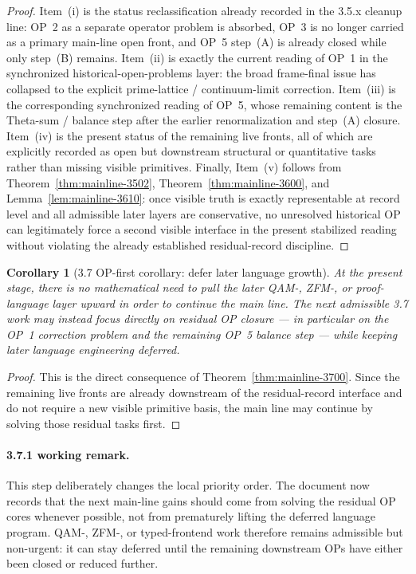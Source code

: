 \documentclass[12pt,a4paper]{article}
\newtheorem{corollary}[theorem]{Corollary}
\begin{document}
\begin{proof}
Item~(i) is the status reclassification already recorded in the 3.5.x cleanup line: OP~2 as a separate operator problem is absorbed, OP~3 is no longer carried as a primary main-line open front, and OP~5 step~(A) is already closed while only step~(B) remains. Item~(ii) is exactly the current reading of OP~1 in the synchronized historical-open-problems layer: the broad frame-final issue has collapsed to the explicit prime-lattice / continuum-limit correction. Item~(iii) is the corresponding synchronized reading of OP~5, whose remaining content is the Theta-sum / balance step after the earlier renormalization and step~(A) closure. Item~(iv) is the present status of the remaining live fronts, all of which are explicitly recorded as open but downstream structural or quantitative tasks rather than missing visible primitives. Finally, Item~(v) follows from Theorem~\ref{thm:mainline-3502}, Theorem~\ref{thm:mainline-3600}, and Lemma~\ref{lem:mainline-3610}: once visible truth is exactly representable at record level and all admissible later layers are conservative, no unresolved historical OP can legitimately force a second visible interface in the present stabilized reading without violating the already established residual-record discipline.
\end{proof}

\begin{corollary}[3.7 OP-first corollary: defer later language growth]
\label{cor:mainline-3700}
At the present stage, there is no mathematical need to pull the later QAM-, ZFM-, or proof-language layer upward in order to continue the main line. The next admissible 3.7 work may instead focus directly on residual OP closure --- in particular on the OP~1 correction problem and the remaining OP~5 balance step --- while keeping later language engineering deferred.
\end{corollary}

\begin{proof}
This is the direct consequence of Theorem~\ref{thm:mainline-3700}. Since the remaining live fronts are already downstream of the residual-record interface and do not require a new visible primitive basis, the main line may continue by solving those residual tasks first.
\end{proof}

\paragraph{3.7.1 working remark.}
This step deliberately changes the local priority order. The document now records that the next main-line gains should come from solving the residual OP cores whenever possible, not from prematurely lifting the deferred language program. QAM-, ZFM-, or typed-frontend work therefore remains admissible but non-urgent: it can stay deferred until the remaining downstream OPs have either been closed or reduced further.
\end{document}
